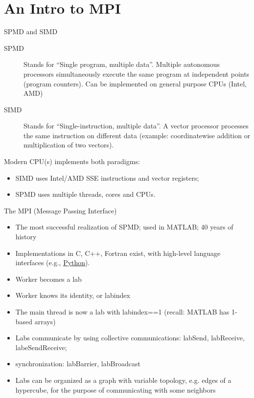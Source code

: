 \documentclass[pdflatex,colorlinks,landscape]{beamer}
\renewcommand\emph[1]{{\color{magenta}#1}}
\begin{document}
\section{An Intro to MPI}
\begin{frame}{SPMD and SIMD}
  \begin{description}
  \item[SPMD] Stands for ``Single program, multiple data''. \emph{Multiple
    autonomous processors} simultaneously execute the same program at
    independent points (program counters). Can be implemented on general
    purpose CPUs (Intel, AMD)
  \item[SIMD] Stands for ``Single-instruction, multiple data''.  A
    \emph{vector processor} processes the same instruction on different
    data (example: coordinatewise addition or multiplication of two
    vectors).
  \end{description}
  Modern CPU(s) implements \emph{both paradigms}:
  \begin{itemize}
  \item SIMD uses Intel/AMD \emph{SSE instructions} and \emph{vector registers};
  \item SPMD uses multiple \emph{threads}, \emph{cores} and CPUs.
  \end{itemize}
\end{frame}

\begin{frame}{The MPI (Message Passing Interface)}
  \begin{itemize}
  \item The most successful realization of SPMD; used in MATLAB; 40 years of history 
  \item Implementations in C, C++, Fortran exist, with high-level
    language interfaces
    (e.g., \href{https://mpi4py.readthedocs.io/en/stable/}{Python}).
  \item Worker becomes a \emph{lab}
  \item Worker knows its identity, or \emph{labindex}
  \item The main thread is now a lab with \emph{labindex==1} (recall: MATLAB has 1-based arrays)
  \item Labs communicate by using \emph{collective communications}: labSend, labReceive, labeSendReceive;
  \item synchronization: labBarrier, labBroadcast
  \item Labs can be organized as a graph with variable topology, e.g. edges of a hypercube, for
    the purpose of communicating with some neighbors
  \end{itemize}
\end{frame}
\end{document}
